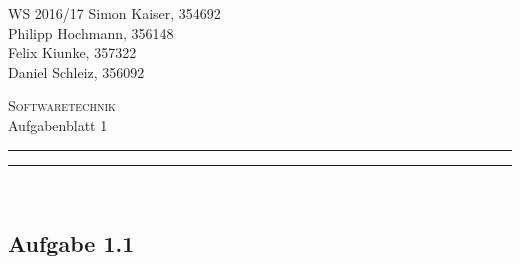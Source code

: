 \documentclass[a4paper,graphics,11pt]{article}
\newcommand\aufgabe[1]{\subsection*{Aufgabe #1}}
\newcommand\aufgabenteil[1]{\subsubsection*{#1}}
\begin{document}
\noindent WS 2016/17        \hfill Simon Kaiser, 354692 \\
\null                                     \hfill Philipp Hochmann, 356148 \\
\null                                     \hfill Felix Kiunke, 357322 \\
\null                                     \hfill Daniel Schleiz, 356092 \\

\begin{center}
\Large \textsc{Softwaretechnik} \\   %
\large Aufgabenblatt 1                        %
\end{center}
\begin{center}
\rule[0.5ex]{\textwidth}{0.6pt}\vspace*{-\baselineskip}\vspace{3.2pt}
\rule[0.5ex]{\textwidth}{1.6pt}\\
\end{center}


%
% 

\aufgabe{1.1}
\end{document}
